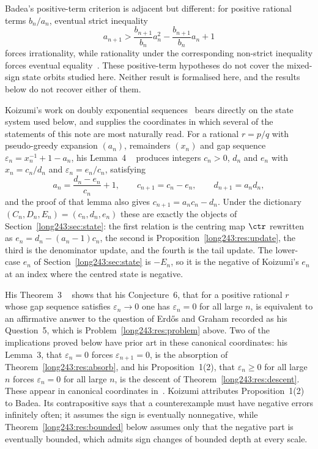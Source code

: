 Badea's positive-term criterion is adjacent but different:
for positive rational terms $b_n/a_n$, eventual strict inequality
\[
 a_{n+1}>\frac{b_{n+1}}{b_n}a_n^2-\frac{b_{n+1}}{b_n}a_n+1
\]
forces irrationality, while rationality under the corresponding non-strict
inequality forces eventual equality~\cite[Theorem~A, p.~313; Cor.~2.2,
p.~316]{badea1993}.  These positive-term hypotheses do not cover the
mixed-sign state orbits studied here.  Neither result is formalised here, and
the results below do not recover either of them.

Koizumi's work on doubly exponential sequences~\cite{koizumi2025} bears
directly on the state system used below, and supplies the coordinates in which
several of the statements of this note are most naturally read.  For a rational
$r=p/q$ with pseudo-greedy expansion $(a_n)$, remainders $(x_n)$ and gap
sequence $\varepsilon_n=x_n^{-1}+1-a_n$, his Lemma~4
~\cite[pp.~11--12]{koizumi2025} produces integers $c_n>0$,
$d_n$ and $e_n$ with $x_n=c_n/d_n$ and $\varepsilon_n=e_n/c_n$, satisfying
\[
 a_n=\frac{d_n-e_n}{c_n}+1,\qquad
 c_{n+1}=c_n-e_n,\qquad
 d_{n+1}=a_nd_n ,
\]
and the proof of that lemma also gives $c_{n+1}=a_nc_n-d_n$.  Under the
dictionary $(C_n,D_n,E_n)=(c_n,d_n,e_n)$ these are exactly the objects of
Section~\ref{long243:sec:state}: the first relation is the centring map $\ctr$ rewritten
as $e_n=d_n-(a_n-1)c_n$, the second is Proposition~\ref{long243:res:update}, the third
is the denominator update, and the fourth is the tail update.  The lower-case
$e_n$ of Section~\ref{long243:sec:state} is $-E_n$, so it is the negative of Koizumi's
$e_n$ at an index where the centred state is negative.

His Theorem~3
~\cite[pp.~12--13]{koizumi2025} shows
that his Conjecture~6, that for a positive rational $r$ whose gap sequence
satisfies $\varepsilon_n\to0$ one has $\varepsilon_n=0$ for all large $n$,
is equivalent to an affirmative answer to the question of Erd\H{o}s and Graham
recorded as his Question~5, which is Problem~\ref{long243:res:problem} above.
Two of the implications proved below have prior art in these canonical
coordinates: his Lemma~3, that $\varepsilon_n=0$ forces $\varepsilon_{n+1}=0$,
is the absorption of Theorem~\ref{long243:res:absorb}, and his Proposition~1(2), that
$\varepsilon_n\ge0$ for all large $n$ forces $\varepsilon_n=0$ for all large
$n$, is the descent of Theorem~\ref{long243:res:descent}.  These appear in canonical
coordinates in~\cite[Lemma~3, p.~10; Prop.~1(2), pp.~14--15]{koizumi2025}.
Koizumi attributes Proposition~1(2) to Badea.  Its contrapositive says that a
counterexample must have negative errors infinitely often; it assumes the sign
is eventually nonnegative, while Theorem~\ref{long243:res:bounded} below assumes only
that the negative part is eventually bounded, which admits sign changes of
bounded depth at every scale.

